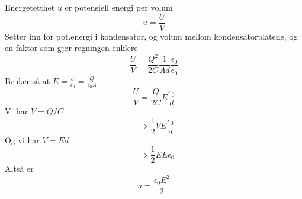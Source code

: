 Energetetthet $u$ er potensiell energi per volum
$$u = \frac{U}{V}$$
Setter inn for pot.energi i kondensator,
og volum mellom kondensatorplatene,
og en faktor som gjør regningen enklere
$$\frac{U}{V} = \frac{Q^2}{2C}\frac{1}{Ad}\frac{\epsilon_0}{\epsilon_0}$$
Bruker så at $E=\frac{\sigma}{\epsilon_0}=\frac{Q}{\epsilon_0 A}$
$$\frac{U}{V} = \frac{Q}{2C}E\frac{\epsilon_0}{d}$$
Vi har $V=Q/C$
$$\implies \frac{1}{2}VE\frac{\epsilon_0}{d}$$
Og vi har $V = Ed$
$$\implies \frac{1}{2}EE\epsilon_0$$
Altså er
$$u = \frac{\epsilon_0 E^2}{2}$$
